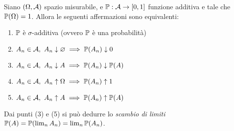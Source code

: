 \medskip
\begin{teob}[\JPTh{2.3}]
  Siano $(\Omega, \mathcal A)$ spazio misurabile, e
  $\mathbb P:\mathcal A \to [0,1]$ funzione additiva e tale che $\mathbb P(\Omega) = 1$.
  Allora le seguenti affermazioni sono equivalenti:
  \begin{enumerate}
    \item $\mathbb P$ è $\sigma$-additiva (ovvero $\mathbb P$ è una probabilità)
    \item $A_n \in \mathcal A, \ A_n \downarrow    \varnothing     \implies \mathbb P(A_n) \downarrow    0$
    \item $A_n \in \mathcal A, \ A_n \downarrow    A           \implies \mathbb P(A_n) \downarrow    \mathbb P(A)$
    \item $A_n \in \mathcal A, \ A_n \uparrow  \Omega      \implies \mathbb P(A_n) \uparrow  1$
    \item $A_n \in \mathcal A, \ A_n \uparrow  A           \implies \mathbb P(A_n) \uparrow  \mathbb P(A)$
  \end{enumerate}
  Dai punti (3) e (5) si può dedurre lo \textit{scambio di limiti} $\mathbb P(A) = \mathbb P(\lim_{n} A_n) = \lim_{n} \mathbb P(A_n)$.
\end{teob}
\smallskip
